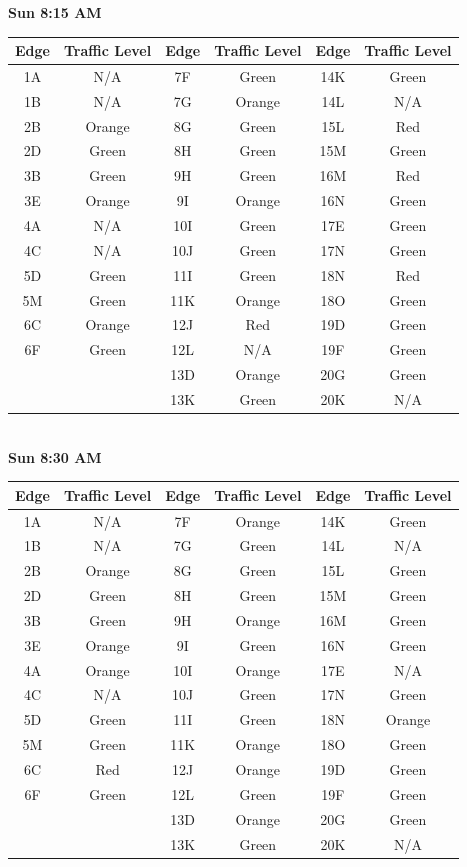 \documentclass{article}
\begin{document}
\textbf{Sun 8:15 AM} \\

\begin{tabular}{|c|c||c|c||c|c|}\hline
Edge & Traffic Level & Edge & Traffic Level & Edge & Traffic Level \\ \hline
1A & N/A & 7F & Green & 14K & Green \\ 
1B & N/A & 7G & Orange & 14L & N/A \\ \hline
2B & Orange & 8G & Green & 15L & Red \\ 
2D & Green & 8H & Green & 15M & Green \\ \hline
3B & Green & 9H & Green & 16M & Red \\ 
3E & Orange & 9I & Orange & 16N & Green \\ \hline 
4A & N/A & 10I & Green & 17E & Green \\ 
4C & N/A & 10J & Green & 17N & Green \\ \hline
5D & Green & 11I & Green & 18N & Red \\ 
5M & Green & 11K & Orange & 18O & Green \\ \hline 
6C & Orange & 12J & Red & 19D & Green \\ 
6F & Green & 12L & N/A & 19F & Green \\ \hline 
& & 13D & Orange & 20G & Green \\
& & 13K & Green & 20K & N/A \\ \hline
\end{tabular} \\

\textbf{Sun 8:30 AM} \\

\begin{tabular}{|c|c||c|c||c|c|}\hline
Edge & Traffic Level & Edge & Traffic Level & Edge & Traffic Level \\ \hline
1A & N/A & 7F & Orange & 14K & Green \\ 
1B & N/A & 7G & Green & 14L & N/A \\ \hline
2B & Orange & 8G & Green & 15L & Green \\ 
2D & Green & 8H & Green & 15M & Green \\ \hline
3B & Green & 9H & Orange & 16M & Green \\ 
3E & Orange & 9I & Green & 16N & Green \\ \hline 
4A & Orange & 10I & Orange & 17E & N/A \\ 
4C & N/A & 10J & Green & 17N & Green \\ \hline
5D & Green & 11I & Green & 18N & Orange \\ 
5M & Green & 11K & Orange & 18O & Green \\ \hline 
6C & Red & 12J & Orange & 19D & Green \\ 
6F & Green & 12L & Green & 19F & Green \\ \hline 
& & 13D & Orange & 20G & Green \\
& & 13K & Green & 20K & N/A \\ \hline
\end{tabular} \\
\end{document}
